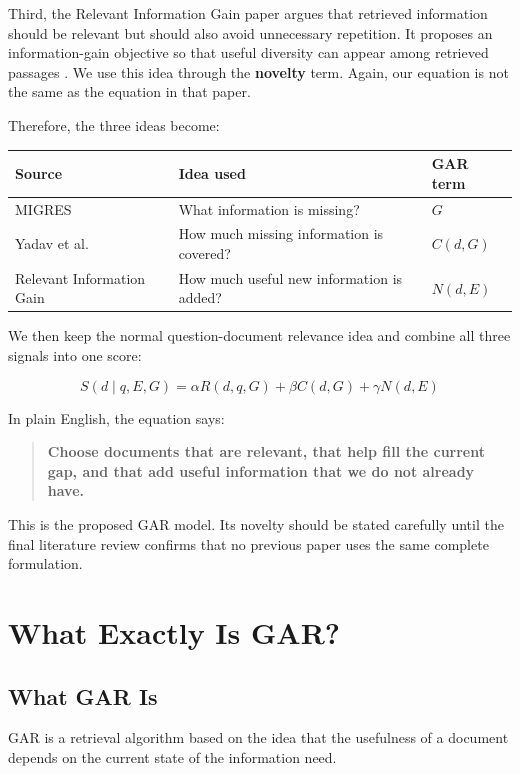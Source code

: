 \documentclass[11pt,a4paper]{article}
\begin{document}
Third, the Relevant Information Gain paper argues that retrieved information should be relevant but should also avoid unnecessary repetition. It proposes an information-gain objective so that useful diversity can appear among retrieved passages \cite{rig}. We use this idea through the \textbf{novelty} term. Again, our equation is not the same as the equation in that paper.

Therefore, the three ideas become:

\begin{center}
\begin{tabular}{lll}
\toprule
\textbf{Source} & \textbf{Idea used} & \textbf{GAR term}\\
\midrule
MIGRES & What information is missing? & $G$\\
Yadav et al. & How much missing information is covered? & $C(d,G)$\\
Relevant Information Gain & How much useful new information is added? & $N(d,E)$\\
\bottomrule\end{tabular}
\end{center}

We then keep the normal question-document relevance idea and combine all three signals into one score:

\[
\boxed{
S(d\mid q,E,G)=\alpha R(d,q,G)+\beta C(d,G)+\gamma N(d,E)
}
\]

In plain English, the equation says:

\begin{quote}
\textbf{Choose documents that are relevant, that help fill the current gap, and that add useful information that we do not already have.}
\end{quote}

This is the proposed GAR model. Its novelty should be stated carefully until the final literature review confirms that no previous paper uses the same complete formulation.


\section{What Exactly Is GAR?}

\subsection{What GAR Is}

GAR is a retrieval algorithm based on the idea that the usefulness of a document depends on the current state of the information need.
\end{document}
